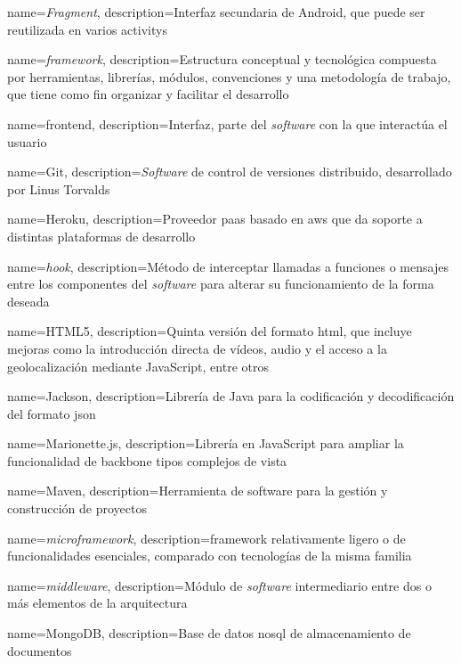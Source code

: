 {
  name={\emph{Fragment}},
  description={Interfaz secundaria de Android, que puede ser reutilizada en varios \glspl{activity}}
}

{
  name={\emph{framework}},
  description={Estructura conceptual y tecnológica compuesta por herramientas, librerías, módulos, convenciones y una metodología de trabajo, que tiene como fin organizar y facilitar el desarrollo}
}

{
  name={frontend},
  description={Interfaz, parte del \emph{software} con la que interactúa el usuario}
}

{
  name={Git},
  description={\emph{Software} de control de versiones distribuido, desarrollado por Linus Torvalds}
}

{
  name={Heroku},
  description={Proveedor \gls{paas} basado en \gls{aws} que da soporte a distintas plataformas de desarrollo}
}

{
  name={\emph{hook}},
  description={Método de interceptar llamadas a funciones o mensajes entre los componentes del \emph{software} para alterar su funcionamiento de la forma deseada}
}

{
  name={HTML5},
  description={Quinta versión del formato \gls{html}, que incluye mejoras como la introducción directa de vídeos, audio y el acceso a la geolocalización mediante JavaScript, entre otros}
}

{
  name={Jackson},
  description={Librería de Java para la codificación y decodificación del formato \gls{json}}
}

{
  name={Marionette.js},
  description={Librería en JavaScript para ampliar la funcionalidad de \gls{backbone} tipos complejos de vista}
}

{
  name={Maven},
  description={Herramienta de software para la gestión y construcción de proyectos}
}

{
  name={\emph{microframework}},
  description={\Gls{framework} relativamente ligero o de funcionalidades esenciales, comparado con tecnologías de la misma familia}
}

{
  name={\emph{middleware}},
  description={Módulo de \emph{software} intermediario entre dos o más elementos de la arquitectura}
}

{
  name={MongoDB},
  description={Base de datos \gls{nosql} de almacenamiento de documentos}
}

